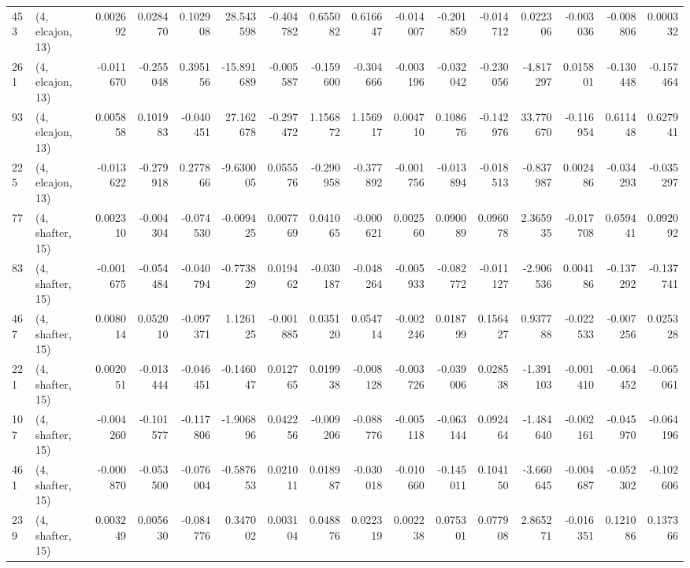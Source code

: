 \begin{tabular}{llrrrrrrrrrrrrrr}
453 &  (4, elcajon, 13) &   0.002692 &  0.028470 &  0.102908 &   28.543598 & -0.404782 &   0.655082 &  0.616647 & -0.014007 & -0.201859 & -0.014712 &    0.022306 & -0.003036 & -0.008806 &  0.000332 \\
261 &  (4, elcajon, 13) &  -0.011670 & -0.255048 &  0.395156 &  -15.891689 & -0.005587 &  -0.159600 & -0.304666 & -0.003196 & -0.032042 & -0.230056 &   -4.817297 &  0.015801 & -0.130448 & -0.157464 \\
93  &  (4, elcajon, 13) &   0.005858 &  0.101983 & -0.040451 &   27.162678 & -0.297472 &   1.156872 &  1.156917 &  0.004710 &  0.108676 & -0.142976 &   33.770670 & -0.116954 &  0.611448 &  0.627941 \\
225 &  (4, elcajon, 13) &  -0.013622 & -0.279918 &  0.277866 &   -9.630005 &  0.055576 &  -0.290958 & -0.377892 & -0.001756 & -0.013894 & -0.018513 &   -0.837987 &  0.002486 & -0.034293 & -0.035297 \\
77  &  (4, shafter, 15) &   0.002310 & -0.004304 & -0.074530 &   -0.009425 &  0.007769 &   0.041065 & -0.000621 &  0.002560 &  0.090089 &  0.096078 &    2.365935 & -0.017708 &  0.059441 &  0.092092 \\
83  &  (4, shafter, 15) &  -0.001675 & -0.054484 & -0.040794 &   -0.773829 &  0.019462 &  -0.030187 & -0.048264 & -0.005933 & -0.082772 & -0.011127 &   -2.906536 &  0.004186 & -0.137292 & -0.137741 \\
467 &  (4, shafter, 15) &   0.008014 &  0.052010 & -0.097371 &    1.126125 & -0.001885 &   0.035120 &  0.054714 & -0.002246 &  0.018799 &  0.156427 &    0.937788 & -0.022533 & -0.007256 &  0.025328 \\
221 &  (4, shafter, 15) &   0.002051 & -0.013444 & -0.046451 &   -0.146047 &  0.012765 &   0.019938 & -0.008128 & -0.003726 & -0.039006 &  0.028538 &   -1.391103 & -0.001410 & -0.064452 & -0.065061 \\
107 &  (4, shafter, 15) &  -0.004260 & -0.101577 & -0.117806 &   -1.906896 &  0.042256 &  -0.009206 & -0.088776 & -0.005118 & -0.063144 &  0.092464 &   -1.484640 & -0.002161 & -0.045970 & -0.064196 \\
461 &  (4, shafter, 15) &  -0.000870 & -0.053500 & -0.076004 &   -0.587653 &  0.021011 &   0.018987 & -0.030018 & -0.010660 & -0.145011 &  0.104150 &   -3.660645 & -0.004687 & -0.052302 & -0.102606 \\
239 &  (4, shafter, 15) &   0.003249 &  0.005630 & -0.084776 &    0.347002 &  0.003104 &   0.048876 &  0.022319 &  0.002238 &  0.075301 &  0.077908 &    2.865271 & -0.016351 &  0.121086 &  0.137366 \\

\end{tabular}
